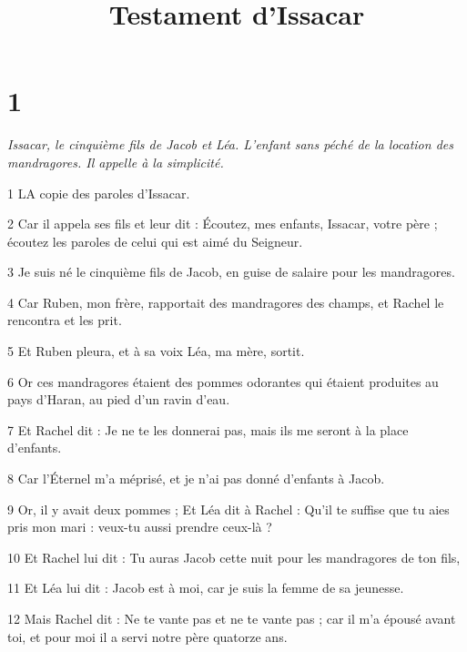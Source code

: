 

\title{Testament d'Issacar}

\chapter{1}

\par \textit{Issacar, le cinquième fils de Jacob et Léa. L'enfant sans péché de la location des mandragores. Il appelle à la simplicité.}

\par 1 LA copie des paroles d'Issacar.

\par 2 Car il appela ses fils et leur dit : Écoutez, mes enfants, Issacar, votre père ; écoutez les paroles de celui qui est aimé du Seigneur.

\par 3 Je suis né le cinquième fils de Jacob, en guise de salaire pour les mandragores.

\par 4 Car Ruben, mon frère, rapportait des mandragores des champs, et Rachel le rencontra et les prit.

\par 5 Et Ruben pleura, et à sa voix Léa, ma mère, sortit.

\par 6 Or ces mandragores étaient des pommes odorantes qui étaient produites au pays d'Haran, au pied d'un ravin d'eau.

\par 7 Et Rachel dit : Je ne te les donnerai pas, mais ils me seront à la place d'enfants.

\par 8 Car l'Éternel m'a méprisé, et je n'ai pas donné d'enfants à Jacob.

\par 9 Or, il y avait deux pommes ; Et Léa dit à Rachel : Qu'il te suffise que tu aies pris mon mari : veux-tu aussi prendre ceux-là ?

\par 10 Et Rachel lui dit : Tu auras Jacob cette nuit pour les mandragores de ton fils,

\par 11 Et Léa lui dit : Jacob est à moi, car je suis la femme de sa jeunesse.

\par 12 Mais Rachel dit : Ne te vante pas et ne te vante pas ; car il m'a épousé avant toi, et pour moi il a servi notre père quatorze ans.

